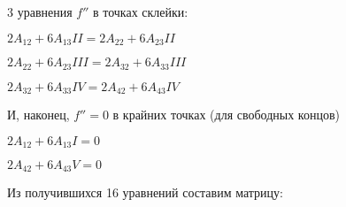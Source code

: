 \documentclass[russian,utf8,nocolumnxxxi,nocolumnxxxii]{eskdtext}
\begin{document}
3 уравнения $f''$ в точках склейки:
\begin{center}

$2A_{12}+6A_{13}II=2A_{22}+6A_{23}II$

$2A_{22}+6A_{23}III=2A_{32}+6A_{33}III$

$2A_{32}+6A_{33}IV=2A_{42}+6A_{43}IV$

\end{center}

И, наконец, $f''=0$ в крайних точках (для свободных концов)
\begin{center}

$2A_{12}+6A_{13}I=0$

$2A_{42}+6A_{43}V=0$

\end{center}

Из получившихся 16 уравнений составим матрицу:

\makeatletter
\renewcommand*\env@matrix[1][c]{\hskip -\arraycolsep
  \let\@ifnextchar\new@ifnextchar
  \array{*\c@MaxMatrixCols #1}}
\makeatother
\end{document}
